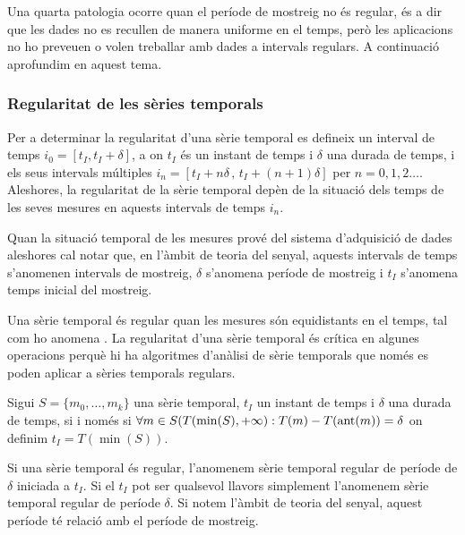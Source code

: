 Una quarta patologia ocorre quan el període de mostreig no és regular,
és a dir que les dades no es recullen de manera uniforme en el temps,
però les aplicacions no ho preveuen o volen treballar amb dades a
intervals regulars. A continuació aprofundim en aquest tema.






\subsubsection{Regularitat de les sèries temporals} 


Per a determinar la regularitat d'una sèrie temporal es defineix un
interval de temps $i_0=[t_I,t_I+\delta]$, a on $t_I$ és un instant de
temps i $\delta$ una durada de temps, i els seus intervals múltiples
$i_n=[t_I+n\delta\, ,\, t_I+(n+1)\delta]$ per
$n=0,1,2\ldots$. Aleshores, la regularitat de la sèrie temporal depèn
de la situació dels temps de les seves mesures en aquests intervals de
temps $i_n$.
 
Quan la situació temporal de les mesures prové del sistema
d'adquisició de dades aleshores cal notar que, en l'àmbit de
teoria del senyal, aquests intervals de temps s'anomenen intervals de
mostreig, $\delta$ s'anomena període de mostreig i $t_I$ s'anomena
temps inicial del mostreig.


Una sèrie temporal és regular quan les mesures són equidistants en el
temps, tal com ho anomena \textcite{last:hetland}.  La regularitat
d'una sèrie temporal és crítica en algunes operacions perquè hi ha
algoritmes d'anàlisi de sèrie temporals que només es poden aplicar a
sèries temporals regulars.
\begin{definition}
  \label{def:st:regular}
  Sigui $S=\{m_0,\ldots,m_k\}$ una sèrie temporal, $t_I$ un instant de
  temps i $\delta$ una durada de temps,
   si i només si $\forall
  m \in S(T(\min(S),+\infty):T(m) - T(\operatorname*{ant}(m)) = \delta$ on definim
  $t_I=T(\min(S))$.
\end{definition}

Si una sèrie temporal és regular, l'anomenem sèrie temporal regular de
període de $\delta$ iniciada a $t_I$. Si el $t_I$ pot ser qualsevol
llavors simplement l'anomenem sèrie temporal regular de període
$\delta$.  Si notem l'àmbit de teoria del senyal, aquest període té
relació amb el període de mostreig.


